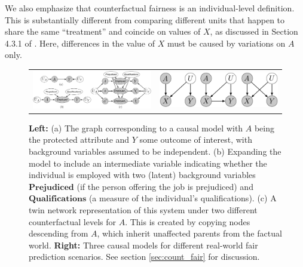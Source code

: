 We also emphasize that counterfactual fairness is an
individual-level definition. This is substantially different
from comparing different units that happen to share the
same ``treatment'' and coincide on values of $X$, as discussed in
Section 4.3.1 of \citep{pearl:16}. Here, differences in the value
of $X$ must be caused by variations on $A$ only.

\begin{figure}
  \begin{tabular}{p{}|p{}}
    \centerline{\includegraphics[width=0.5\columnwidth]{implications_fig.pdf}}&
    \centerline{\includegraphics[width=0.5\columnwidth]{simple_models_no_q3}}
  \end{tabular}
  \caption{\label{fig:ex1} {\bf Left:} (a) The graph corresponding to a causal model with $A$ being the protected attribute
    and $Y$ some outcome of interest, with background variables assumed to be independent.
    (b) Expanding the model to include an intermediate variable indicating whether the individual
    is employed with two (latent) background variables $\textbf{Prejudiced}$ (if the person  offering the job is prejudiced) and $\textbf{Qualifications}$ (a measure of the individual's qualifications). (c) A twin network representation of this system \citep{pearl:00}
    under two different counterfactual levels for $A$. This is created by copying nodes descending from $A$, which inherit unaffected parents from the factual world. {\bf Right:} Three causal models for different real-world fair prediction scenarios.\label{figure.simple_models} See section \ref{sec:count_fair} for discussion.}
\end{figure}

